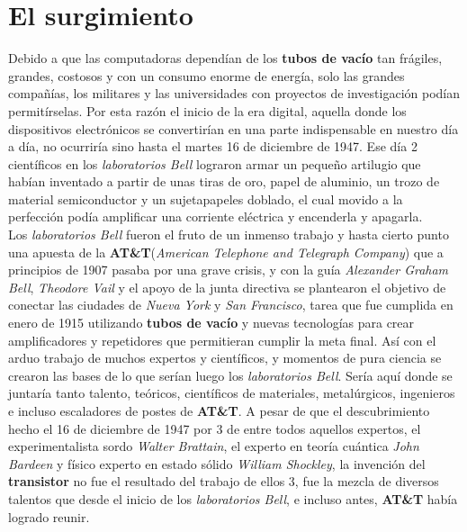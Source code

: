 \section*{El surgimiento}
Debido a que las computadoras dependían de los \textbf{tubos de vacío} tan frágiles, grandes, costosos y con un consumo enorme de energía, solo las grandes 
compañías, los militares y las universidades con proyectos de investigación podían permitírselas. Por esta razón el inicio de la era digital, aquella donde 
los dispositivos electrónicos se convertirían en una parte indispensable en nuestro día a día, no ocurriría sino hasta el martes 16 de diciembre de 1947. Ese 
día 2 científicos en los \emph{laboratorios Bell} lograron armar un pequeño artilugio que habían inventado a partir de unas tiras de oro, papel de aluminio,
un trozo de material semiconductor y un sujetapapeles doblado, el cual movido a la perfección podía amplificar una corriente eléctrica y encenderla y apagarla.\\
Los \emph{laboratorios Bell} fueron el fruto de un inmenso trabajo y hasta cierto punto una apuesta de la \textbf{AT\&T}(\emph{American Telephone and Telegraph 
Company}) que a principios de 1907 pasaba por una grave crisis, y con la guía \emph{Alexander Graham Bell}, \emph{Theodore Vail} y el apoyo de la junta directiva
se plantearon el objetivo de conectar las ciudades de \emph{Nueva York} y \emph{San Francisco}, tarea que fue cumplida en enero de 1915 utilizando \textbf{tubos 
de vacío} y nuevas tecnologías para crear amplificadores y repetidores que permitieran cumplir la meta final. Así con el arduo trabajo de muchos expertos y científicos,
y momentos de pura ciencia se crearon las bases de lo que serían luego los \emph{laboratorios Bell}. Sería aquí donde se juntaría tanto talento, teóricos, científicos de
materiales, metalúrgicos, ingenieros e incluso escaladores de postes de \textbf{AT\&T}. A pesar de que el descubrimiento hecho el 16 de diciembre de 1947 por 3 de entre
todos aquellos expertos, el experimentalista sordo \emph{Walter Brattain}, el experto en teoría cuántica \emph{John Bardeen} y físico experto en estado sólido \emph{William
Shockley}, la invención del \textbf{transistor} no fue el resultado del trabajo de ellos 3, fue la mezcla de diversos talentos que desde el inicio de los \emph{laboratorios
Bell}, e incluso antes, \textbf{AT&T} había logrado reunir.

